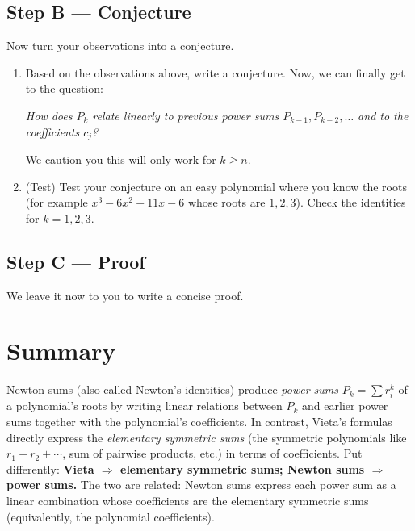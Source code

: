 \documentclass{tufte-handout}
\begin{document}
\vspace{3em}

\subsection*{Step B — Conjecture}
Now turn your observations into a conjecture.

\begin{enumerate}[label=\textbf{B\arabic*.}, leftmargin=*, itemsep=1em]
  \item Based on the observations above, write a conjecture. Now, we can finally get to the question:
  
  \textit{How does $P_k$ relate linearly to previous power sums $P_{k-1},P_{k-2},\dots$ and to the coefficients $c_j$?}

  We caution you this will only work for $k\ge n$.

  \vspace{20em}
  
  \item (Test) Test your conjecture on an easy polynomial where you know the roots (for example $x^3-6x^2+11x-6$ whose roots are $1,2,3$). Check the identities for $k=1,2,3$.

  \vspace{10em}
\end{enumerate}

\subsection*{Step C — Proof}
We leave it now to you to write a concise proof.

\vspace{20em}
\section*{Summary}

Newton sums (also called Newton's identities) produce \emph{power sums} $P_k=\sum r_i^k$ of a polynomial's roots by writing linear relations between $P_k$ and earlier power sums together with the polynomial's coefficients. In contrast, Vieta's formulas directly express the \emph{elementary symmetric sums} (the symmetric polynomials like $r_1+r_2+\cdots$, sum of pairwise products, etc.) in terms of coefficients. Put differently: \textbf{Vieta $\Rightarrow$ elementary symmetric sums; Newton sums $\Rightarrow$ power sums.} The two are related: Newton sums express each power sum as a linear combination whose coefficients are the elementary symmetric sums (equivalently, the polynomial coefficients).
\end{document}
